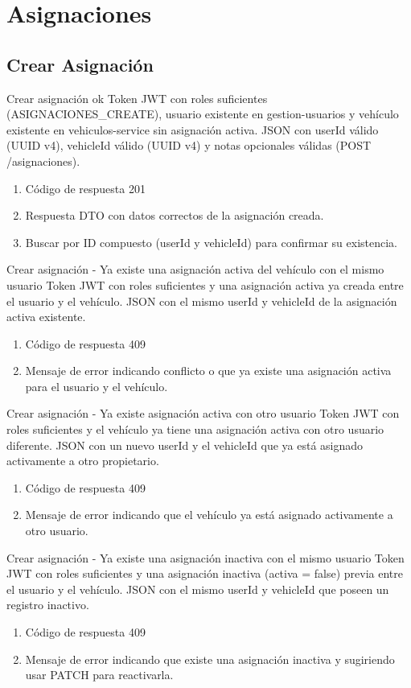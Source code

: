 \section{Asignaciones}
\subsection{Crear Asignación}

{Crear asignación ok}
{Token JWT con roles suficientes (ASIGNACIONES\_CREATE), usuario existente en gestion-usuarios y vehículo existente en vehiculos-service sin asignación activa.}
{JSON con userId válido (UUID v4), vehicleId válido (UUID v4) y notas opcionales válidas (POST /asignaciones).}
{\begin{enumerate} [leftmargin=*, nosep]
    \item Código de respuesta 201
    \item Respuesta DTO con datos correctos de la asignación creada.
    \item Buscar por ID compuesto (userId y vehicleId) para confirmar su existencia.
\end{enumerate}}

{Crear asignación - Ya existe una asignación activa del vehículo con el mismo usuario}
{Token JWT con roles suficientes y una asignación activa ya creada entre el usuario y el vehículo.}
{JSON con el mismo userId y vehicleId de la asignación activa existente.}
{\begin{enumerate} [leftmargin=*, nosep]
    \item Código de respuesta 409
    \item Mensaje de error indicando conflicto o que ya existe una asignación activa para el usuario y el vehículo.
\end{enumerate}}

{Crear asignación - Ya existe asignación activa con otro usuario}
{Token JWT con roles suficientes y el vehículo ya tiene una asignación activa con otro usuario diferente.}
{JSON con un nuevo userId y el vehicleId que ya está asignado activamente a otro propietario.}
{\begin{enumerate} [leftmargin=*, nosep]
    \item Código de respuesta 409
    \item Mensaje de error indicando que el vehículo ya está asignado activamente a otro usuario.
\end{enumerate}}

{Crear asignación - Ya existe una asignación inactiva con el mismo usuario}
{Token JWT con roles suficientes y una asignación inactiva (activa = false) previa entre el usuario y el vehículo.}
{JSON con el mismo userId y vehicleId que poseen un registro inactivo.}
{\begin{enumerate} [leftmargin=*, nosep]
    \item Código de respuesta 409
    \item Mensaje de error indicando que existe una asignación inactiva y sugiriendo usar PATCH para reactivarla.
\end{enumerate}}

